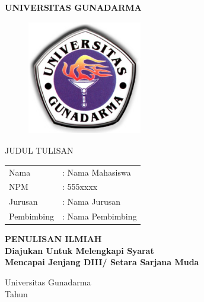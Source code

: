 \documentclass{article}
\begin{document}
\newpage
{}
\begin{center}
\bfseries
 { \Large UNIVERSITAS GUNADARMA}
\vspace{0.75cm}

\begin{figure}[h]
\begin{center}
\includegraphics[height=5cm,width=5cm]{LogoGunadarma.jpg}
\end{center}
\end{figure}

\vspace{1.0cm}

 {\large JUDUL TULISAN}

\bfseries \vspace{0.5cm}
\begin{tabular}{ll}
Nama& : Nama Mahasiswa\tabularnewline NPM& : 555xxxx
\tabularnewline Jurusan& : Nama Jurusan\tabularnewline
Pembimbing& : Nama Pembimbing
\end{tabular}
\end{center}
\vspace{1.25cm}
\begin{center}
\bfseries PENULISAN ILMIAH \\
Diajukan Untuk Melengkapi Syarat \\
Mencapai Jenjang DIII/ Setara Sarjana Muda\\

\vspace{2.0cm}

Universitas Gunadarma\\
Tahun %

\end{center}
\end{document}
